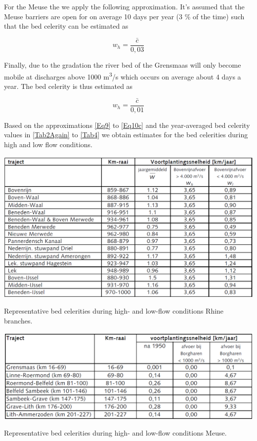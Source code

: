 For the Meuse the we apply the following approximation.
It's assumed that the Meuse barriers are open for on average 10 days per year (3 \% of the time) such that the bed celerity can be estimated as

\begin{equation}
w_h = \frac{\bar{c}}{0,03}
\label{10b}
\end{equation}


Finally, due to the gradation the river bed of the Grensmaas will only become mobile at discharges above 1000 m\textsuperscript{3}/s which occurs on average about 4 days a year.
The bed celerity is thus estimated as

\begin{equation}
w_h = \frac{\bar{c}}{0,01}
\label{Eq10c}
\end{equation}

Based on the approximations \autoref{Eq9} to \autoref{Eq10c} and the year-averaged bed celerity values in \autoref{Tab2Again} to \autoref{Tab4} we obtain estimates for the bed celerities during high and low flow conditions.

\begin{table}
\includegraphics[width=\columnwidth]{figures/Tab4_the2nd.png}
\caption{Representative bed celerities during high- and low-flow conditions Rhine branches.}
\label{Tab4RT}
\end{table}

\begin{table}
\includegraphics[width=\columnwidth]{figures/Tab5.png}
\caption{Representative bed celerities during high- and low-flow conditions Meuse.}
\label{Tab5}
\end{table}
